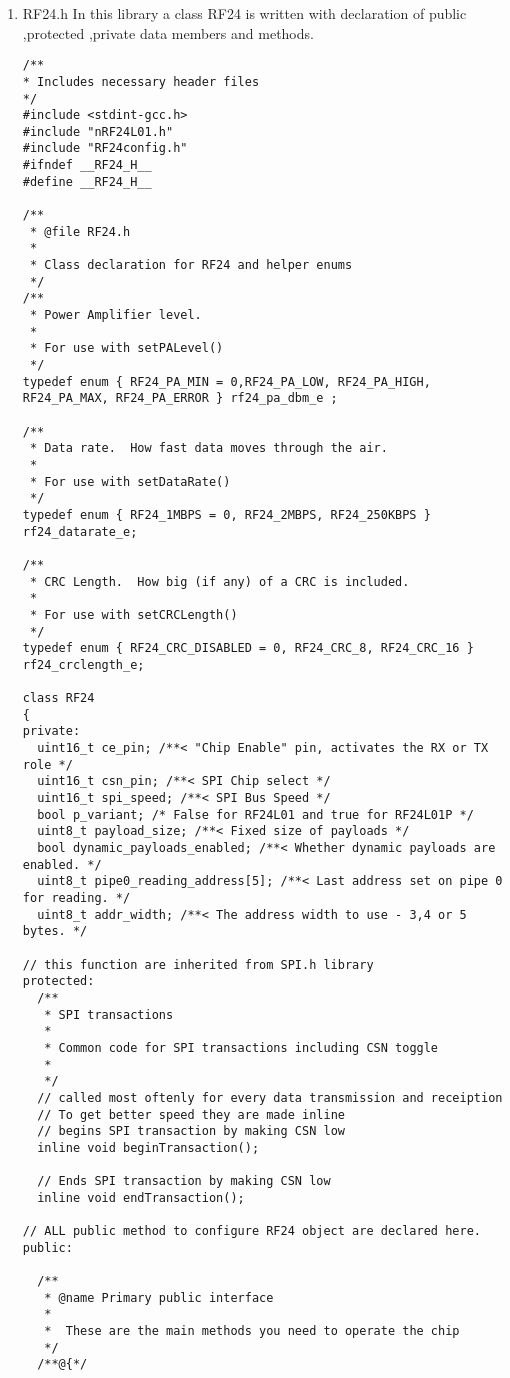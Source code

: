 \documentclass{article}
\begin{document}
\begin{itemize}
\begin{enumerate}
\begin{enumerate}
\begin{lstlisting}
\end{lstlisting}
\item RF24.h
\newline In this library a class RF24 is written with declaration of public ,protected ,private data members and methods.
\begin{lstlisting}
/**
* Includes necessary header files
*/
#include <stdint-gcc.h>
#include "nRF24L01.h"
#include "RF24config.h"
#ifndef __RF24_H__
#define __RF24_H__

/**
 * @file RF24.h
 *
 * Class declaration for RF24 and helper enums
 */
/**
 * Power Amplifier level.
 *
 * For use with setPALevel()
 */
typedef enum { RF24_PA_MIN = 0,RF24_PA_LOW, RF24_PA_HIGH, RF24_PA_MAX, RF24_PA_ERROR } rf24_pa_dbm_e ;

/**
 * Data rate.  How fast data moves through the air.
 *
 * For use with setDataRate()
 */
typedef enum { RF24_1MBPS = 0, RF24_2MBPS, RF24_250KBPS } rf24_datarate_e;

/**
 * CRC Length.  How big (if any) of a CRC is included.
 *
 * For use with setCRCLength()
 */
typedef enum { RF24_CRC_DISABLED = 0, RF24_CRC_8, RF24_CRC_16 } rf24_crclength_e;
	
class RF24
{
private:
  uint16_t ce_pin; /**< "Chip Enable" pin, activates the RX or TX role */
  uint16_t csn_pin; /**< SPI Chip select */
  uint16_t spi_speed; /**< SPI Bus Speed */  
  bool p_variant; /* False for RF24L01 and true for RF24L01P */
  uint8_t payload_size; /**< Fixed size of payloads */
  bool dynamic_payloads_enabled; /**< Whether dynamic payloads are enabled. */
  uint8_t pipe0_reading_address[5]; /**< Last address set on pipe 0 for reading. */
  uint8_t addr_width; /**< The address width to use - 3,4 or 5 bytes. */
  
// this function are inherited from SPI.h library
protected:
  /**
   * SPI transactions
   *
   * Common code for SPI transactions including CSN toggle
   *
   */
  // called most oftenly for every data transmission and receiption
  // To get better speed they are made inline
  // begins SPI transaction by making CSN low
  inline void beginTransaction();

  // Ends SPI transaction by making CSN low
  inline void endTransaction();

// ALL public method to configure RF24 object are declared here. 
public:

  /**
   * @name Primary public interface
   *
   *  These are the main methods you need to operate the chip
   */
  /**@{*/


\end{lstlisting}
\end{enumerate}
\end{enumerate}
\end{itemize}
\end{document}
